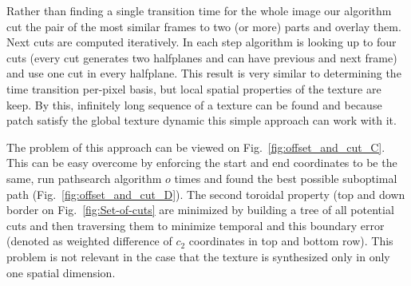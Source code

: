 	Rather than finding a single transition time for the whole image our algorithm cut the pair of the most similar frames to two (or more) parts and overlay them. Next cuts are computed iteratively. In each step algorithm is looking up to four cuts (every cut generates two halfplanes and can have previous and next frame) and use one cut in every halfplane. This result is very similar to determining the time transition per-pixel basis, but local spatial properties of the texture are keep. By this, infinitely long sequence of a texture can be found and because patch satisfy the global texture dynamic this simple approach can work with it.

		The problem of this approach can be viewed on Fig.~\ref{fig:offset_and_cut_C}. This can be easy overcome by enforcing the start and end coordinates  to be the same, run pathsearch algorithm $o$ times and found the best possible suboptimal path (Fig.~\ref{fig:offset_and_cut_D}). The second toroidal property (top and down border on Fig.~\ref{fig:Set-of-cuts} are minimized by building a tree of all potential cuts and then traversing them to minimize temporal and this boundary error (denoted as weighted difference of $c_2$ coordinates in top and bottom row). This problem is not relevant in the case that the texture is synthesized only in only one spatial dimension.
		
